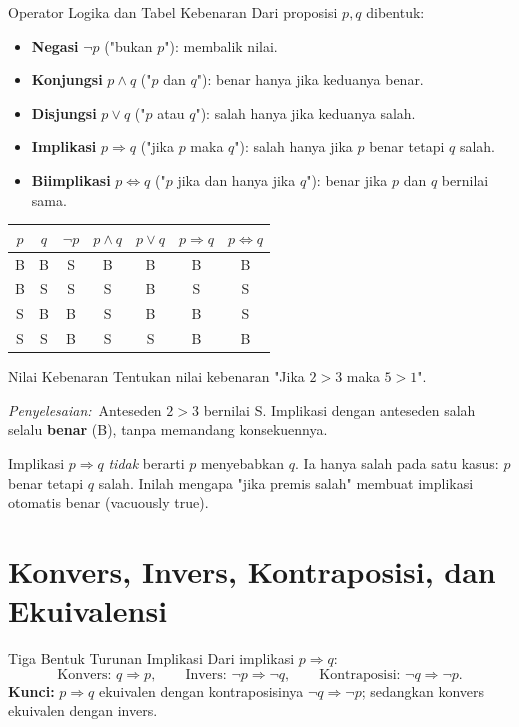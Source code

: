 \documentclass[11pt,a4paper]{report}
\theoremstyle{gaya}
\newcommand{\jawab}{\par\smallskip\noindent\textit{\textcolor{oranye}{Penyelesaian:}}\ }
\begin{document}
\begin{konsep}{Operator Logika dan Tabel Kebenaran}
Dari proposisi $p,q$ dibentuk:
\begin{itemize}[leftmargin=*,topsep=2pt]
  \item \textbf{Negasi} $\lnot p$ ("bukan $p$"): membalik nilai.
  \item \textbf{Konjungsi} $p\wedge q$ ("$p$ dan $q$"): benar hanya jika keduanya benar.
  \item \textbf{Disjungsi} $p\vee q$ ("$p$ atau $q$"): salah hanya jika keduanya salah.
  \item \textbf{Implikasi} $p\Rightarrow q$ ("jika $p$ maka $q$"): salah hanya jika $p$ benar tetapi $q$ salah.
  \item \textbf{Biimplikasi} $p\Leftrightarrow q$ ("$p$ jika dan hanya jika $q$"): benar jika $p$ dan $q$ bernilai sama.
\end{itemize}
\begin{center}
\begin{tabular}{c c | c c c c c}
\toprule
$p$ & $q$ & $\lnot p$ & $p\wedge q$ & $p\vee q$ & $p\Rightarrow q$ & $p\Leftrightarrow q$\\
\midrule
B & B & S & B & B & B & B\\
B & S & S & S & B & S & S\\
S & B & B & S & B & B & S\\
S & S & B & S & S & B & B\\
\bottomrule
\end{tabular}
\end{center}
\end{konsep}

\begin{contoh}{Nilai Kebenaran}
Tentukan nilai kebenaran "Jika $2>3$ maka $5>1$".

\jawab Anteseden $2>3$ bernilai S. Implikasi dengan anteseden salah selalu \textbf{benar} (B), tanpa memandang konsekuennya.
\end{contoh}

\begin{kesalahan}
Implikasi $p\Rightarrow q$ \emph{tidak} berarti $p$ menyebabkan $q$. Ia hanya salah pada satu kasus: $p$ benar tetapi $q$ salah. Inilah mengapa "jika premis salah" membuat implikasi otomatis benar (vacuously true).
\end{kesalahan}

\section{Konvers, Invers, Kontraposisi, dan Ekuivalensi}
\begin{konsep}{Tiga Bentuk Turunan Implikasi}
Dari implikasi $p\Rightarrow q$:
\[
\text{Konvers: } q\Rightarrow p,\qquad
\text{Invers: } \lnot p\Rightarrow\lnot q,\qquad
\text{Kontraposisi: } \lnot q\Rightarrow\lnot p.
\]
\textbf{Kunci:} $p\Rightarrow q$ ekuivalen dengan kontraposisinya $\lnot q\Rightarrow\lnot p$; sedangkan konvers ekuivalen dengan invers.
\end{konsep}
\end{document}
